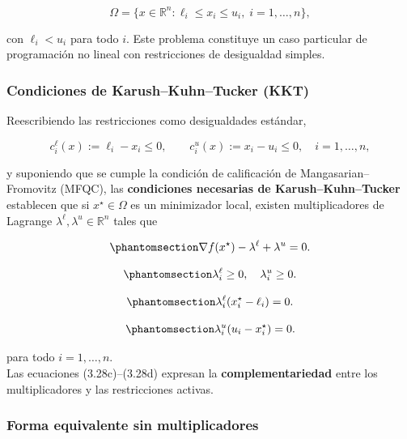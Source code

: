 \documentclass[
  spanish,
  us-letterpaper,
  DIV=11,
  numbers=noendperiod]{scrreprt}
\numberwithin{equation}{section}
\begin{document}
\[
\Omega = \{x \in \mathbb{R}^n : \ell_i \le x_i \le u_i,\; i=1,\dots,n\},
\]

con \(\ell_i < u_i\) para todo \(i\). Este problema constituye un caso
particular de programación no lineal con restricciones de desigualdad
simples.

\subsubsection{Condiciones de Karush--Kuhn--Tucker
(KKT)}\label{condiciones-de-karushkuhntucker-kkt}

Reescribiendo las restricciones como desigualdades estándar,

\[
c_i^{\ell}(x) := \ell_i - x_i \le 0, \qquad
c_i^{u}(x) := x_i - u_i \le 0, \quad i = 1,\dots,n,
\tag{3.27}
\]

y suponiendo que se cumple la condición de calificación de
Mangasarian--Fromovitz (MFQC), las \textbf{condiciones necesarias de
Karush--Kuhn--Tucker} establecen que si \(x^\star \in \Omega\) es un
minimizador local, existen multiplicadores de Lagrange
\(\lambda^\ell, \lambda^u \in \mathbb{R}^n\) tales que

\begin{equation}\phantomsection\label{eq-kkt-a}{
\nabla f(x^\star) - \lambda^\ell + \lambda^u = 0.
}\end{equation}

\begin{equation}\phantomsection\label{eq-kkt-b}{
\lambda_i^\ell \ge 0,\quad \lambda_i^u \ge 0.
}\end{equation}

\begin{equation}\phantomsection\label{eq-kkt-c}{
\lambda_i^\ell (x_i^\star - \ell_i) = 0.
}\end{equation}

\begin{equation}\phantomsection\label{eq-kkt-d}{
\lambda_i^u (u_i - x_i^\star) = 0.
}\end{equation}

para todo \(i = 1,\dots,n\).\\
Las ecuaciones (3.28c)--(3.28d) expresan la \textbf{complementariedad}
entre los multiplicadores y las restricciones activas.

\subsubsection{Forma equivalente sin
multiplicadores}\label{forma-equivalente-sin-multiplicadores}
\end{document}
